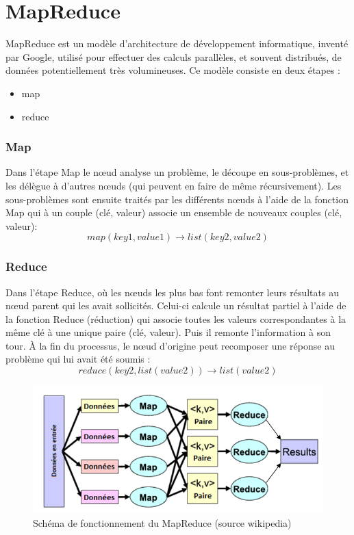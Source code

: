 \section{MapReduce}

MapReduce est un modèle d'architecture de développement informatique, inventé par Google, utilisé pour effectuer des calculs parallèles, et souvent distribués, de données potentiellement très volumineuses.
Ce modèle consiste en deux étapes :
\begin{itemize}
	\item map
	\item reduce
\end{itemize}

\subsubsection{Map}

Dans l'étape Map le nœud analyse un problème, le découpe en sous-problèmes, et les délègue à d'autres nœuds (qui peuvent en faire de même récursivement).
Les sous-problèmes sont ensuite traités par les différents nœuds à l'aide de la fonction Map qui à un couple (clé, valeur) associe un ensemble de nouveaux couples (clé, valeur):
\begin{equation}
map(key1,value1) → list(key2,value2)
\end{equation}

\subsubsection{Reduce}

Dans l'étape Reduce, où les nœuds les plus bas font remonter leurs résultats au nœud parent qui les avait sollicités.
Celui-ci calcule un résultat partiel à l'aide de la fonction Reduce (réduction) qui associe toutes les valeurs correspondantes à la même clé à une unique paire (clé, valeur).
Puis il remonte l'information à son tour.
À la fin du processus, le nœud d'origine peut recomposer une réponse au problème qui lui avait été soumis :
\begin{equation}
reduce(key2,list(value2))→ list(value2)
\end{equation}



\begin{figure}[htpb]
	\centering
	\includegraphics[scale = 0.5]{images/Mapreduce}
	\caption{Schéma de fonctionnement du MapReduce (source wikipedia)}
	\label{fig:MapReduce}
\end{figure}


